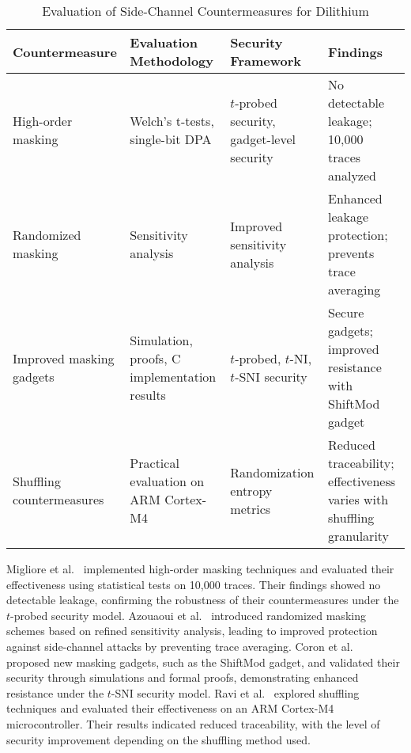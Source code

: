 \begin{table}[ht]
    \centering
    \renewcommand{\arraystretch}{1.2}
    \caption{Evaluation of Side-Channel Countermeasures for Dilithium}
    \label{tab:countermeasures}
    \begin{tabularx}{\textwidth}{|X|X|X|X|}
        \hline
        \textbf{Countermeasure}                 & \textbf{Evaluation Methodology}              & \textbf{Security Framework}                  & \textbf{Findings}                                                     \\ \hline
        High-order masking \cite{Migliore19}    & Welch's t-tests, single-bit DPA              & \(t\)-probed security, gadget-level security & No detectable leakage; 10,000 traces analyzed                         \\ \hline
        Randomized masking \cite{Azouaoui22}    & Sensitivity analysis                         & Improved sensitivity analysis                & Enhanced leakage protection; prevents trace averaging                 \\ \hline
        Improved masking gadgets \cite{Coron23} & Simulation, proofs, C implementation results & \(t\)-probed, \(t\)-NI, \(t\)-SNI security   & Secure gadgets; improved resistance with ShiftMod gadget              \\ \hline
        Shuffling countermeasures \cite{Ravi20} & Practical evaluation on ARM Cortex-M4        & Randomization entropy metrics                & Reduced traceability; effectiveness varies with shuffling granularity \\ \hline
    \end{tabularx}
\end{table}

Migliore et al.~\cite{Migliore19} implemented high-order masking techniques and evaluated their effectiveness using statistical tests on 10,000 traces. Their findings showed no detectable leakage, confirming the robustness of their countermeasures under the \(t\)-probed security model. Azouaoui et al.~\cite{Azouaoui22} introduced randomized masking schemes based on refined sensitivity analysis, leading to improved protection against side-channel attacks by preventing trace averaging. Coron et al.~\cite{Coron23} proposed new masking gadgets, such as the ShiftMod gadget, and validated their security through simulations and formal proofs, demonstrating enhanced resistance under the \(t\)-SNI security model. Ravi et al.~\cite{Ravi20} explored shuffling techniques and evaluated their effectiveness on an ARM Cortex-M4 microcontroller. Their results indicated reduced traceability, with the level of security improvement depending on the shuffling method used.

